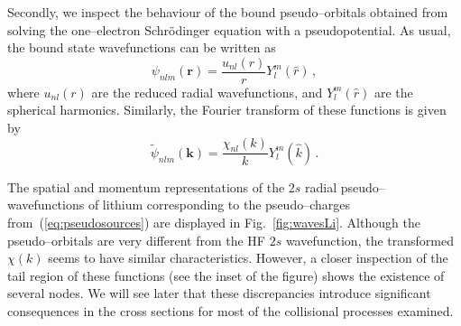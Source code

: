 \documentclass[10pt]{article}
\begin{document}
Secondly, we inspect the behaviour of the bound pseudo--orbitals 
obtained from solving the one--electron Schr\"odinger equation with a 
pseudopotential. As usual, the bound state wavefunctions can be 
written as
\begin{equation}
 \psi_{nlm}(\mathbf{r}) = \frac{u_{nl}(r)}{r}Y_l^m(\hat{r})\,,
 \label{eq:centralfield-wave}
\end{equation}
where $u_{nl}(r)$ are the reduced radial wavefunctions, and 
$Y_l^m(\hat{r})$ are the spherical harmonics. Similarly, the Fourier 
transform of these functions is given by
\begin{equation}
 \widetilde{\psi}_{nlm}(\mathbf{k}) =
 \frac{\chi_{nl}(k)}{k}Y_l^m(\hat{k})\,.
\end{equation}

The spatial and momentum representations of the $2s$ radial 
pseudo--wavefunctions of lithium corresponding to the pseudo--charges 
from~(\ref{eq:pseudosources}) are displayed in Fig.~\ref{fig:wavesLi}.
Although the pseudo--orbitals are very different
from the HF $2s$ wavefunction, the transformed $\chi(k)$ seems to 
have similar characteristics. However, a closer inspection of the 
tail region of these functions (see the inset of the figure) 
shows the existence of several nodes.
We will see later that these discrepancies introduce significant 
consequences in the cross sections for most of the collisional 
processes examined.
\end{document}
